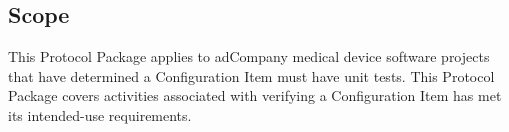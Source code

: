 \subsection{Scope}
This Protocol Package applies to adCompany medical device software projects that
have determined a Configuration Item must have unit tests.  This Protocol
Package covers activities associated with verifying a Configuration Item has met
its intended-use requirements.
